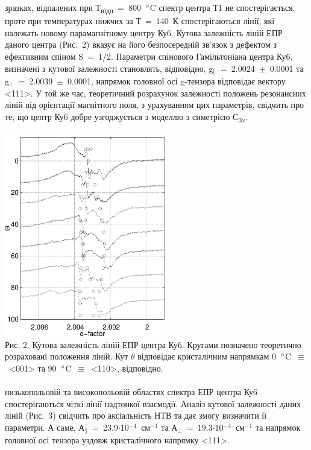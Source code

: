  зразках, відпалених при Т\textsubscript{відп}~=~800~$\degree$C спектр центра Т1 не спостерігається, проте при температурах нижчих за Т~=~140~К спостерігаються лінії, які належать новому парамагнітному центру Ку6. Кутова залежність ліній ЕПР даного центра (Рис.~2) вказує на його безпосередній зв'язок з дефектом з ефективним спіном S~=~1/2. Параметри спінового Гамільтоніана центра Ку6, визначені з кутової залежності становлять, відповідно, g$_\parallel$~=~2.0024~$\pm$~0.0001 та g$_\perp$~=~2.0039~$\pm$~0.0001, напрямок головної осі \mbox{g-тензора} відповідає вектору <111>. У той же час, теоретичний розрахунок залежності положень резонансних ліній від орієнтації магнітного поля, з урахуванням цих параметрів, свідчить про те, що центр Ку6 добре узгоджується з моделлю з симетрією С\textsubscript{3v}.\\
\\
\includegraphics[width=200pt]{images/g2.eps}\mbox{}\\
\small Рис. 2. Кутова залежність ліній ЕПР центра Ку6. Кругами позначено теоретично розраховані положення ліній. Кут $\theta$ відповідає кристалічним напрямкам 0~$\degree$C~$\equiv$~<001> та 90~$\degree$C~$\equiv$~<110>, відповідно.\\
\\
\normalsize
{} низькопольовій та високопольовій областях спектра ЕПР центра Ку6 спостерігаються чіткі лінії надтонкої взаємодії. Аналіз кутової залежності даних ліній (Рис.~3) свідчить про аксіальність НТВ та дає змогу визначити її параметри. А саме, А$_\parallel$~=~23.9$\cdot$10$^{-4}$~см$^{-1}$ та А$_\perp$~=~19.3$\cdot$10$^{-4}$~см$^{-1}$ та напрямок головної осі тензора уздовж кристалічного напрямку <111>.\\
